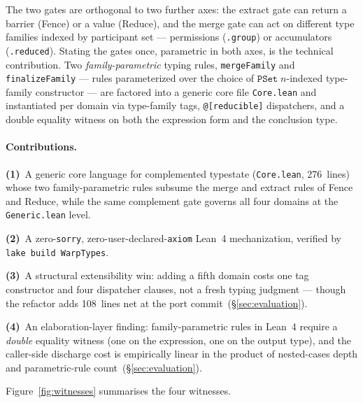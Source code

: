 \documentclass[acmsmall,screen,review,anonymous,nonacm]{acmart}
\newcommand{\PSet}{\texttt{PSet}}
\begin{document}
The two gates are orthogonal to two further axes: the extract gate can return a barrier (Fence) or a value (Reduce), and the merge gate can act on different type families indexed by participant set --- permissions (\texttt{.group}) or accumulators (\texttt{.reduced}). Stating the gates once, parametric in both axes, is the technical contribution. Two \emph{family-parametric} typing rules, \texttt{mergeFamily} and \texttt{finalizeFamily} --- rules parameterized over the choice of $\PSet\;n$-indexed type-family constructor --- are factored into a generic core file \texttt{Core.lean} and instantiated per domain via type-family tags, \texttt{@[reducible]} dispatchers, and a double equality witness on both the expression form and the conclusion type.

\paragraph{Contributions.}
\textbf{(1)}~A generic core language for complemented typestate (\texttt{Core.lean}, 276~lines) whose two family-parametric rules subsume the merge and extract rules of Fence and Reduce, while the same complement gate governs all four domains at the \texttt{Generic.lean} level.

\textbf{(2)}~A zero-\texttt{sorry}, zero-user-declared-\texttt{axiom} Lean~4 mechanization, verified by \texttt{lake build WarpTypes}.

\textbf{(3)}~A structural extensibility win: adding a fifth domain costs one tag constructor and four dispatcher clauses, not a fresh typing judgment --- though the refactor adds 108~lines net at the port commit~(\S\ref{sec:evaluation}).

\textbf{(4)}~An elaboration-layer finding: family-parametric rules in Lean~4 require a \emph{double} equality witness (one on the expression, one on the output type), and the caller-side discharge cost is empirically linear in the product of nested-cases depth and parametric-rule count~(\S\ref{sec:evaluation}).

Figure~\ref{fig:witnesses} summarises the four witnesses.
\end{document}
